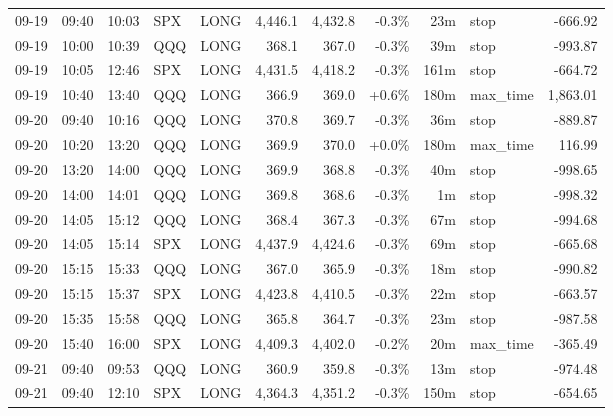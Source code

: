 \documentclass[11pt,a4paper,twoside]{article}
\begin{document}
\begin{center}
\begin{longtable}{>{\color{txtmain}}l l l l l r r r r >{\color{txtmain}}l r}
09-19 & 09:40 & 10:03 & SPX & LONG & 4,446.1 & 4,432.8 & \textcolor{lossred}{-0.3\%} & 23m & stop & \textcolor{lossred}{-666.92} \\
09-19 & 10:00 & 10:39 & QQQ & LONG & 368.1 & 367.0 & \textcolor{lossred}{-0.3\%} & 39m & stop & \textcolor{lossred}{-993.87} \\
09-19 & 10:05 & 12:46 & SPX & LONG & 4,431.5 & 4,418.2 & \textcolor{lossred}{-0.3\%} & 161m & stop & \textcolor{lossred}{-664.72} \\
09-19 & 10:40 & 13:40 & QQQ & LONG & 366.9 & 369.0 & \textcolor{wingreen}{+0.6\%} & 180m & max\_time & \textcolor{wingreen}{1,863.01} \\
09-20 & 09:40 & 10:16 & QQQ & LONG & 370.8 & 369.7 & \textcolor{lossred}{-0.3\%} & 36m & stop & \textcolor{lossred}{-889.87} \\
09-20 & 10:20 & 13:20 & QQQ & LONG & 369.9 & 370.0 & \textcolor{wingreen}{+0.0\%} & 180m & max\_time & \textcolor{wingreen}{116.99} \\
09-20 & 13:20 & 14:00 & QQQ & LONG & 369.9 & 368.8 & \textcolor{lossred}{-0.3\%} & 40m & stop & \textcolor{lossred}{-998.65} \\
09-20 & 14:00 & 14:01 & QQQ & LONG & 369.8 & 368.6 & \textcolor{lossred}{-0.3\%} & 1m & stop & \textcolor{lossred}{-998.32} \\
09-20 & 14:05 & 15:12 & QQQ & LONG & 368.4 & 367.3 & \textcolor{lossred}{-0.3\%} & 67m & stop & \textcolor{lossred}{-994.68} \\
09-20 & 14:05 & 15:14 & SPX & LONG & 4,437.9 & 4,424.6 & \textcolor{lossred}{-0.3\%} & 69m & stop & \textcolor{lossred}{-665.68} \\
09-20 & 15:15 & 15:33 & QQQ & LONG & 367.0 & 365.9 & \textcolor{lossred}{-0.3\%} & 18m & stop & \textcolor{lossred}{-990.82} \\
09-20 & 15:15 & 15:37 & SPX & LONG & 4,423.8 & 4,410.5 & \textcolor{lossred}{-0.3\%} & 22m & stop & \textcolor{lossred}{-663.57} \\
09-20 & 15:35 & 15:58 & QQQ & LONG & 365.8 & 364.7 & \textcolor{lossred}{-0.3\%} & 23m & stop & \textcolor{lossred}{-987.58} \\
09-20 & 15:40 & 16:00 & SPX & LONG & 4,409.3 & 4,402.0 & \textcolor{lossred}{-0.2\%} & 20m & max\_time & \textcolor{lossred}{-365.49} \\
09-21 & 09:40 & 09:53 & QQQ & LONG & 360.9 & 359.8 & \textcolor{lossred}{-0.3\%} & 13m & stop & \textcolor{lossred}{-974.48} \\
09-21 & 09:40 & 12:10 & SPX & LONG & 4,364.3 & 4,351.2 & \textcolor{lossred}{-0.3\%} & 150m & stop & \textcolor{lossred}{-654.65} \\

\end{longtable}
\end{center}
\end{document}
